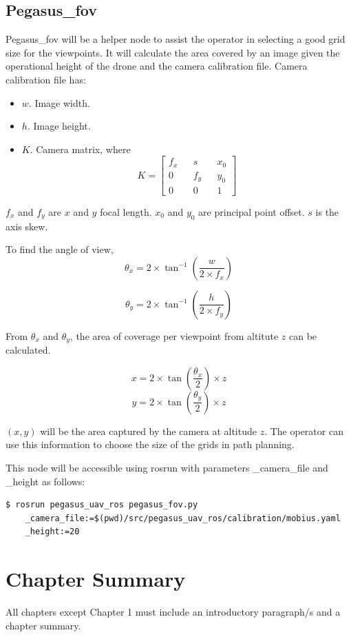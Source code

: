 \subsection{Pegasus\_fov}
Pegasus\_fov will be a helper node to assist the operator in selecting a good grid size for the viewpoints. It will calculate the area covered by an image given the operational height of the drone and the camera calibration file. Camera calibration file has:

\begin{itemize}
	\item $w$. Image width.
	\item $h$. Image height.
	\item $K$. Camera matrix, where 
	$$K = \begin{bmatrix}
	f_x && s   && x_0 \\
	0   && f_y && y_0 \\
	0   && 0   && 1
	\end{bmatrix}$$
\end{itemize}

$f_x$ and $f_y$ are $x$ and $y$ focal length. $x_0$ and $y_0$ are principal point offset. $s$ is the axis skew.

To find the angle of view,
$$ \theta_x = 2 \times \tan^{-1}(\frac{w}{2 \times f_x}) $$

$$ \theta_y = 2 \times \tan^{-1}(\frac{h}{2 \times f_y}) $$

From $\theta_x$ and $\theta_y$, the area of coverage per viewpoint from altitute $z$ can be calculated.

$$ x = 2 \times \tan(\frac{\theta_x}{2}) \times z $$
$$ y = 2 \times \tan(\frac{\theta_y}{2}) \times z $$ 

$(x, y)$ will be the area captured by the camera at altitude $z$. The operator can use this information to choose the size of the grids in path planning.

This node will be accessible using rosrun with parameters \_camera\_file and \_height as follows:

\begin{verbatim}
$ rosrun pegasus_uav_ros pegasus_fov.py 
    _camera_file:=$(pwd)/src/pegasus_uav_ros/calibration/mobius.yaml 
    _height:=20
\end{verbatim}

\section{Chapter Summary}
All chapters except Chapter 1 must include an introductory paragraph/s and a chapter summary.

\FloatBarrier